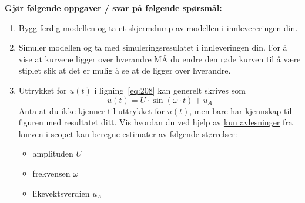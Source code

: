       {\bf Gjør følgende oppgaver / svar på følgende spørsmål:    }
  \begin{enumerate}[label=f\arabic*)]
  \item   Bygg ferdig modellen og ta et skjermdump av modellen
    i innlevereringen  din.
    \item  Simuler modellen og ta med simuleringsresulatet
    i innleveringen din.
    For å vise at kurvene ligger over
  hverandre MÅ du endre den  røde kurven til å være  stiplet slik
  at det er mulig  å se at de ligger over hverandre.

  \item   Uttrykket for $u(t)$ i ligning~\eqref{eq:208} kan generelt skrives som
  \begin{equation}
    u(t) = U {\cdot} \sin(\omega{\cdot}t) + u_{A}
  \end{equation}
   Anta at du ikke kjenner til uttrykket for  $u(t)$, men bare har
   kjennskap til figuren med resultatet ditt.
   Vis hvordan du ved hjelp av \underline{kun avlesninger} fra kurven i scopet kan
   beregne estimater av følgende størrelser:
   \begin{itemize}
   \item amplituden  $U$
     \item frekvensen $\omega$ 
   \item likevektsverdien $u_{A}$
   \end{itemize}
   
  \end{enumerate}
